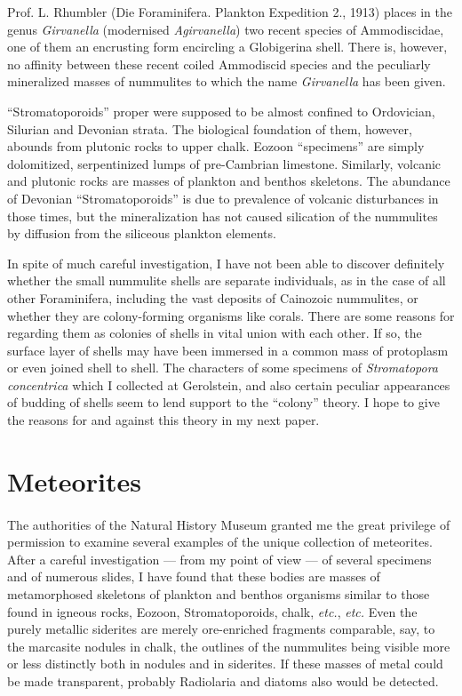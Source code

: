 \documentclass[a4paper, 12pt, oneside]{article}
\begin{document}
Prof. L. Rhumbler (Die Foraminifera. Plankton Expedition 2., 1913) places in the genus \emph{Girvanella} (modernised \emph{Agirvanella}) two recent species of Ammodiscidae, one of them an encrusting form encircling a Globigerina shell. There is, however, no affinity between these recent coiled Ammodiscid species and the peculiarly mineralized masses of nummulites to which the name \emph{Girvanella} has been given.

``Stromatoporoids'' proper were supposed to be almost confined to Ordovician, Silurian and Devonian strata. The biological foundation of them, however, abounds from plutonic rocks to upper chalk. Eozoon ``specimens'' are simply dolomitized, serpentinized lumps of pre-Cambrian limestone. Similarly, volcanic and plutonic rocks are masses of plankton and benthos skeletons. The abundance of Devonian ``Stromatoporoids'' is due to prevalence of volcanic disturbances in those times, but the mineralization has not caused silication of the nummulites by diffusion from the siliceous plankton elements.

In spite of much careful investigation, I have not been able to discover definitely whether the small nummulite shells are separate individuals, as in the case of all other Foraminifera, including the vast deposits of Cainozoic nummulites, or whether they are colony-forming organisms like corals. There are some reasons for regarding them as colonies of shells in vital union with each other. If so, the surface layer of shells may have been immersed in a common mass of protoplasm or even joined shell to shell. The characters of some specimens of \emph{Stromatopora concentrica} which I collected at Gerolstein, and also certain peculiar appearances of budding of shells seem to lend support to the ``colony'' theory. I hope to give the reasons for and against this theory in my next paper.
\clearpage
\section{Meteorites}
\paragraph{}
The authorities of the Natural History Museum granted me the great privilege of permission to examine several examples of the unique collection of meteorites. After a careful investigation --- from my point of view --- of several specimens and of numerous slides, I have found that these bodies are masses of metamorphosed skeletons of plankton and benthos organisms similar to those found in igneous rocks, Eozoon, Stromatoporoids, chalk, \emph{etc.}, \emph{etc.} Even the purely metallic siderites are merely ore-enriched fragments comparable, say, to the marcasite nodules in chalk, the outlines of the nummulites being visible more or less distinctly both in nodules and in siderites. If these masses of metal could be made transparent, probably Radiolaria and diatoms also would be detected.
\end{document}
